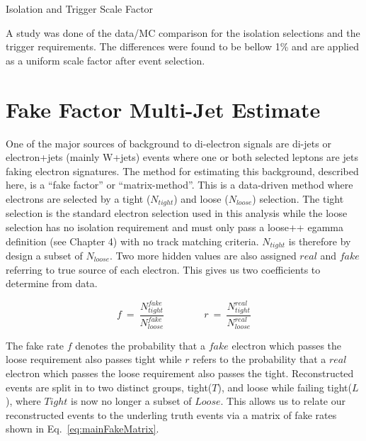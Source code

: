    {\bf\raggedright Isolation and Trigger Scale Factor}

   {\raggedright A study was done of the data/MC comparison for the isolation selections and the trigger requirements. The differences were found to be bellow 1\% and are applied as a uniform scale factor after event selection.}




\section{Fake Factor Multi-Jet Estimate}

One of the major sources of background to di-electron signals are di-jets or electron+jets (mainly W+jets) events where one or both selected leptons are jets faking electron signatures. The method for estimating this background, described here, is a ``fake factor'' or ``matrix-method''. This is a data-driven method where electrons are selected by a tight ($N_{tight}$) and loose ($N_{loose}$) selection. The tight selection is the standard electron selection used in this analysis while the loose selection has no isolation requirement and must only pass a loose++ egamma definition (see Chapter 4) with no track matching criteria. $N_{tight}$ is therefore by design a subset of $N_{loose}$. Two more hidden values are also assigned $real$ and $fake$ referring to true source of each electron. This gives us two coefficients to determine from data.

\begin{equation} \label{eq:fakeRate}
   f~=~\frac{N^{fake}_{tight}}{N^{fake}_{loose}} \qquad \qquad r~=~\frac{N^{real}_{tight}}{N^{real}_{loose}}
\end{equation}

The fake rate $f$ denotes the probability that a $fake$ electron which passes the loose requirement also passes tight while $r$ refers to the probability that a $real$ electron which passes the loose requirement also passes the tight.
Reconstructed events are split in to two distinct groups, tight($T$), and loose while failing tight($L$), where $Tight$ is now no longer a subset of $Loose$. This allows us to relate our reconstructed events to the underling truth events via a matrix of fake rates shown in Eq.~\ref{eq:mainFakeMatrix}.

